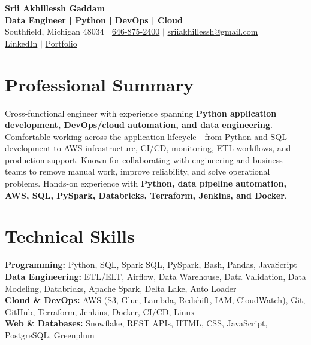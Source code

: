 \documentclass[letterpaper,10pt]{article}
\begin{document}
\fontsize{9.35pt}{10.45pt}\selectfont

\begin{center}
    {\LARGE \textbf{Srii Akhillessh Gaddam}} \\[-1pt]
    \textbf{Data Engineer | Python | DevOps | Cloud} \\[2pt]
    Southfield, Michigan 48034 $|$
    \href{tel:6468752400}{646-875-2400} $|$
    \href{mailto:sriiakhillessh@gmail.com}{sriiakhillessh@gmail.com} \\[1pt]
    \href{https://www.linkedin.com/in/srii-akhiilessh-gaddam-b48668191/}{LinkedIn} $|$
    \href{https://sriiakhillesshg.github.io/portfolio/}{Portfolio}
\end{center}
\vspace{-8pt}

\section{Professional Summary}
\small{Cross-functional engineer with experience spanning \textbf{Python application development, DevOps/cloud automation, and data engineering}. Comfortable working across the application lifecycle - from Python and SQL development to AWS infrastructure, CI/CD, monitoring, ETL workflows, and production support. Known for collaborating with engineering and business teams to remove manual work, improve reliability, and solve operational problems. Hands-on experience with \textbf{Python, data pipeline automation, AWS, SQL, PySpark, Databricks, Terraform, Jenkins, and Docker}.}

\section{Technical Skills}
\small{
\textbf{Programming:} Python, SQL, Spark SQL, PySpark, Bash, Pandas, JavaScript \\
\textbf{Data Engineering:} ETL/ELT, Airflow, Data Warehouse, Data Validation, Data Modeling, Databricks, Apache Spark, Delta Lake, Auto Loader \\
\textbf{Cloud \& DevOps:} AWS (S3, Glue, Lambda, Redshift, IAM, CloudWatch), Git, GitHub, Terraform, Jenkins, Docker, CI/CD, Linux \\
\textbf{Web \& Databases:} Snowflake, REST APIs, HTML, CSS, JavaScript, PostgreSQL, Greenplum
}
\end{document}
